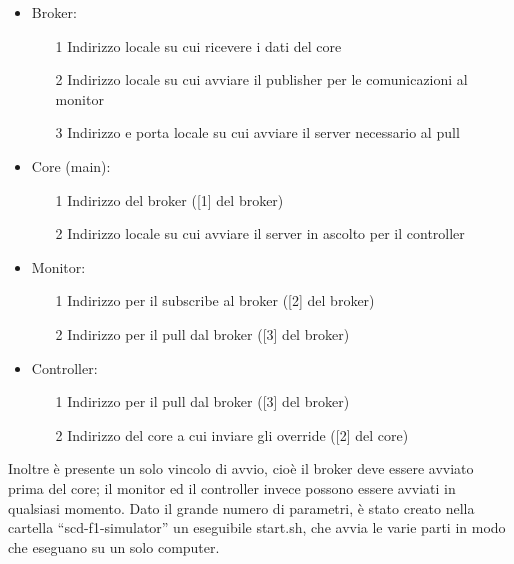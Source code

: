 \begin{itemize}
 \item Broker:
 \begin{itemize}
  \item [1] Indirizzo locale su cui ricevere i dati del core
  \item [2] Indirizzo locale su cui avviare il publisher per le comunicazioni al monitor
  \item [3] Indirizzo e porta locale su cui avviare il server necessario al pull
 \end{itemize}
 \item Core (main):
 \begin{itemize}
  \item [1] Indirizzo del broker ([1] del broker)
  \item [2] Indirizzo locale su cui avviare il server in ascolto per il controller
 \end{itemize}
 \item Monitor:
 \begin{itemize}
  \item [1] Indirizzo per il subscribe al broker ([2] del broker)
  \item [2] Indirizzo per il pull dal broker ([3] del broker)
 \end{itemize}
 \item Controller:
 \begin{itemize}
  \item [1] Indirizzo per il pull dal broker ([3] del broker)
  \item [2] Indirizzo del core a cui inviare gli override ([2] del core)
 \end{itemize}
\end{itemize}

Inoltre è presente un solo vincolo di avvio, cioè il broker deve essere avviato prima del core; il monitor ed il controller invece possono essere avviati in qualsiasi momento.
Dato il grande numero di parametri, è stato creato nella cartella “scd-f1-simulator” un eseguibile start.sh, che avvia le varie parti in modo che eseguano su un solo computer.